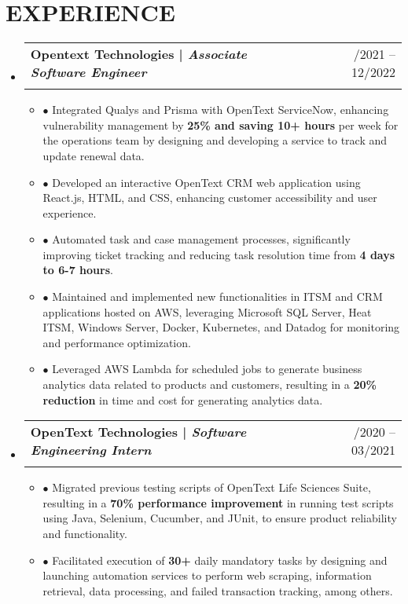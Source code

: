 \documentclass[letterpaper,11pt]{article}
\makeatletter
\newcommand{\resumeExp}[4]{
\vspace{0mm}\item[]
    \begin{tabular*}{\textwidth}[t]{l@{\extracolsep{\fill}}r}
        \hspace{-4.4mm} \small\textbf{#1} & {\footnotesize{#3}}\vspace{-1.2mm}\\
        \hspace{-4.3mm} \footnotesize{\text{#2}} & \footnotesize{#4}
    \end{tabular*}
    \vspace{-6.1mm}
}
\newcommand{\resumeSubHeadingListStart}{\begin{itemize}[leftmargin=*,labelsep=0mm,itemsep=-2.5mm]}
\newcommand{\resumeItemListStart}{\begin{justify}\begin{itemize}[leftmargin=3ex, rightmargin=2ex, noitemsep,labelsep=1.2mm,itemsep=0mm]\small}
\newcommand{\resumeSubHeadingListEnd}{\end{itemize}\vspace{-2mm}}
\newcommand{\resumeItemListEnd}{\end{itemize}\end{justify}\vspace{-1.5mm}}
\makeatother
\begin{document}
\section{\normalfont EXPERIENCE}
\resumeSubHeadingListStart



\resumeExp
{\normalfont \textbf{Opentext Technologies } | \textbf{\textit{Associate Software  Engineer}}}
{\normalfont Hyderabad, India}
{\normalfont 04/2021 -- 12/2022}
{\normalfont }
\vspace{1.0mm}
\resumeItemListStart
\normalfont \item[$\bullet$] Integrated Qualys and Prisma with OpenText ServiceNow, enhancing vulnerability management by \textbf{25\% and saving 10+ hours} per week for the operations team by designing and developing a service to track and update renewal data.
\normalfont \item[$\bullet$] Developed an interactive OpenText CRM web application using React.js, HTML, and CSS, enhancing customer accessibility and user experience.
\normalfont \item[$\bullet$] Automated task and case management processes, significantly improving ticket tracking and reducing task resolution time from \textbf{4 days to 6-7 hours}.
\normalfont \item[$\bullet$]Maintained and implemented new functionalities in ITSM and CRM applications hosted on AWS, leveraging Microsoft SQL Server, Heat ITSM, Windows Server, Docker, Kubernetes, and Datadog for monitoring and performance optimization.
\normalfont \item[$\bullet$]Leveraged AWS Lambda for scheduled jobs to generate business analytics data related to products and customers, resulting in a \textbf{20\% reduction} in time and cost for generating analytics data.
\resumeItemListEnd

\vspace{1.0mm}
\resumeExp
{\normalfont \textbf{OpenText Technologies} | \textbf{\textit{Software Engineering Intern}}}
{\normalfont Bangalore, India}
{\normalfont 12/2020 -- 03/2021}
{}
\vspace{1.0mm}
\resumeItemListStart
\normalfont \item[$\bullet$] Migrated previous testing scripts of OpenText Life Sciences Suite, resulting in a \textbf{70\% performance improvement} in running test scripts using Java, Selenium, Cucumber, and JUnit, to ensure product reliability and functionality.
\normalfont \item[$\bullet$] Facilitated execution of \textbf{30+} daily mandatory tasks by designing and launching automation services to perform web scraping, information retrieval, data processing, and failed transaction tracking, among others.
\resumeItemListEnd
\vspace{1.0mm}
\resumeSubHeadingListEnd
\vspace{-6.0mm}
\end{document}
